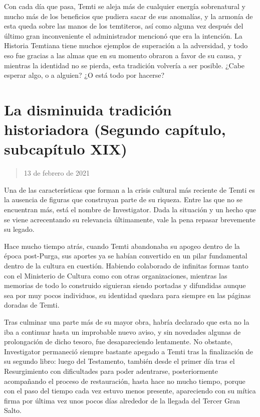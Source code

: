 \documentclass[
  spanish,
]{book}
\begin{document}
Con cada día que pasa, Temti se aleja más de cualquier energía sobrenatural y mucho más de los beneficios que pudiera sacar de sus anomalías, y la armonía de esta queda sobre las manos de los temtiteros, así como alguna vez después del último gran inconveniente el administrador mencionó que era la intención. La Historia Temtiana tiene muchos ejemplos de superación a la adversidad, y todo eso fue gracias a las almas que en su momento obraron a favor de su causa, y mientras la identidad no se pierda, esta tradición volvería a ser posible. ¿Cabe esperar algo, o a alguien? ¿O está todo por hacerse?

\hypertarget{la-disminuida-tradiciuxf3n-historiadora-segundo-capuxedtulo-subcapuxedtulo-xix}{%
\section{La disminuida tradición historiadora (Segundo capítulo, subcapítulo XIX)}\label{la-disminuida-tradiciuxf3n-historiadora-segundo-capuxedtulo-subcapuxedtulo-xix}}

\begin{quote}
13 de febrero de 2021
\end{quote}

Una de las características que forman a la crisis cultural más reciente de Temti es la ausencia de figuras que construyan parte de su riqueza. Entre las que no se encuentran más, está el nombre de Investigator. Dada la situación y un hecho que se viene acrecentando su relevancia últimamente, vale la pena repasar brevemente su legado.

Hace mucho tiempo atrás, cuando Temti abandonaba su apogeo dentro de la época post-Purga, sus aportes ya se habían convertido en un pilar fundamental dentro de la cultura en cuestión. Habiendo colaborado de infinitas formas tanto con el Ministerio de Cultura como con otras organizaciones, mientras las memorias de todo lo construido siguieran siendo portadas y difundidas aunque sea por muy pocos individuos, su identidad quedara para siempre en las páginas doradas de Temti.

Tras culminar una parte más de su mayor obra, habría declarado que esta no la iba a continuar hasta un improbable nuevo aviso, y sin novedades algunas de prolongación de dicho tesoro, fue desapareciendo lentamente. No obstante, Investigator permaneció siempre bastante apegado a Temti tras la finalización de su segundo libro: luego del Testamento, también desde el primer día tras el Resurgimiento con dificultades para poder adentrarse, posteriormente acompañando el proceso de restauración, hasta hace no mucho tiempo, porque con el paso del tiempo cada vez estuvo menos presente, apareciendo con su mítica firma por última vez unos pocos días alrededor de la llegada del Tercer Gran Salto.
\end{document}
